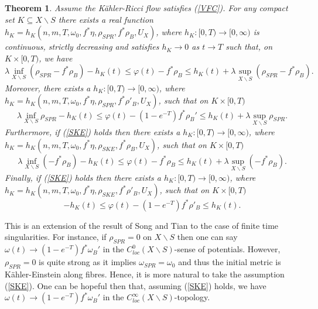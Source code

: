 \documentclass[12pt]{article}
\newtheorem{theorem}{Theorem}[section]
\numberwithin{equation}{section}
\begin{document}
\begin{theorem}
Assume the K\"ahler-Ricci flow satisfies (\ref{VFC}). For any compact set $K \subseteq X \backslash S$ there exists a real function $h_K = h_K(n,m,T,\omega_0,f^*\eta,\rho_{SPR},f^*\rho_B,U_X)$, where $h_K:[0,T) \to [0,\infty)$ is continuous, strictly decreasing and satisfies $h_K \to 0$ as $t \to T$ such that, on $K \times [0,T)$, we have
\begin{equation*}
    \lambda \inf_{X \backslash S} (\rho_{SPR} - f^*\rho_B) - h_K(t) \leq \varphi(t) - f^*\rho_B \leq h_K(t) + \lambda \sup_{X \backslash S} (\rho_{SPR} - f^*\rho_B).
\end{equation*}
Moreover, there exists a $h_K:[0,T) \to [0,\infty)$, where $h_K = h_K(n,m,T,\omega_0,f^*\eta,\rho_{SPR},f^*\rho'_B,U_X)$, such that on $K \times [0,T)$
\begin{equation*}
    \lambda \inf_{X \backslash S} \rho_{SPR} - h_K(t) \leq \varphi(t) - (1-e^{-T}) f^*\rho_B' \leq h_K(t) + \lambda \sup_{X \backslash S} \rho_{SPR}.
\end{equation*}
Furthermore, if (\ref{SKE}) holds then there exists a $h_K: [0,T) \to [0,\infty)$, where $h_K = h_K(n,m,T,\omega_0,f^*\eta,\rho_{SKE},f^*\rho_B, U_X)$, such that on $K \times [0,T)$
\begin{equation*}
    \lambda \inf_{X \backslash S} (- f^*\rho_B) - h_K(t) \leq \varphi(t) - f^*\rho_B \leq h_K(t) + \lambda \sup_{X \backslash S} (- f^*\rho_B).
\end{equation*}
Finally, if (\ref{SKE}) holds then there exists a $h_K: [0,T) \to [0,\infty)$, where $h_K = h_K(n,m,T,\omega_0,f^*\eta,\rho_{SKE},f^*\rho'_B, U_X)$, such that on $K \times [0,T)$
\begin{equation*}
     - h_K(t) \leq \varphi(t) - (1-e^{-T})f^*\rho'_B \leq h_K(t).
\end{equation*}
\end{theorem}

\noindent This is an extension of the result \cite[Prop. 5.4]{ST12} of Song and Tian to the case of finite time singularities. For instance, if $\rho_{SPR} = 0$ on $X \backslash S$ then one can say $\omega(t) \to (1-e^{-T})f^*\omega_B'$ in the $C^0_{loc}(X\backslash S)$-sense of potentials. However, $\rho_{SPR} = 0$ is quite strong as it implies $\omega_{SPR} = \omega_{0}$ and thus the initial metric is K\"ahler-Einstein along fibres. Hence, it is more natural to take the assumption (\ref{SKE}). One can be hopeful then that, assuming (\ref{SKE}) holds, we have $\omega(t) \to (1-e^{-T}) f^*\omega_B'$ in the $C^\infty_{loc}(X \backslash S)$-topology.\\
\end{document}
